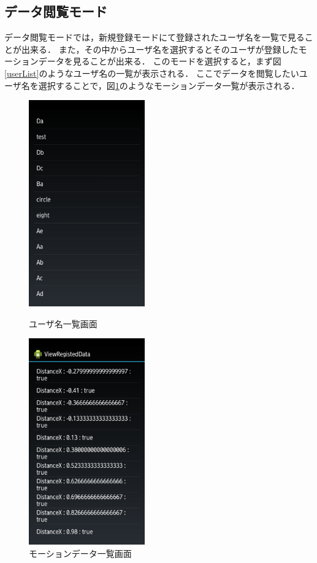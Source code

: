 \documentclass[11pt]{jreport}
\begin{document}
	    \subsection{データ閲覧モード}
	    データ閲覧モードでは，新規登録モードにて登録されたユーザ名を一覧で見ることが出来る．
        また，その中からユーザ名を選択するとそのユーザが登録したモーションデータを見ることが出来る．
        このモードを選択すると，まず図\ref{userList}のようなユーザ名の一覧が表示される．
        ここでデータを閲覧したいユーザ名を選択することで，図\ref{dataList}のようなモーションデータ一覧が表示される．

        \begin{figure}[htbp]
            \begin{minipage}{0.5\hsize}
                \begin{center}
                    \includegraphics[width=5cm, bb=0 0 540 960]{UserList.pdf}
                \end{center}
                \caption{ユーザ名一覧画面}
                \label{userList}
            \end{minipage}
            \begin{minipage}{0.5\hsize}
                \begin{center}
                    \includegraphics[width=5cm, bb=0 0 540 960]{DataList.pdf}
                \end{center}
                \caption{モーションデータ一覧画面}
                \label{dataList}
            \end{minipage}
        \end{figure}
\end{document}
